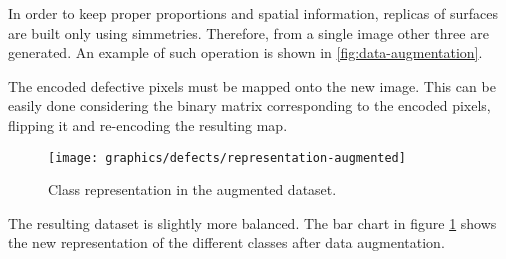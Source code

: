         \par{
            In order to keep proper proportions and spatial information, replicas of surfaces are built only using simmetries. Therefore, from a single image other three are generated. An example of such operation is shown in \ref{fig:data-augmentation}.
        }
        \par{
            The encoded defective pixels must be mapped onto the new image. This can be easily done considering the binary matrix corresponding to the encoded pixels, flipping it and re-encoding the resulting map.
        }
        \begin{figure}
            \texttt{[image: graphics/defects/representation-augmented]}
            \caption{Class representation in the augmented dataset.}\label{fig:defects:representation-augmented}
        \end{figure}
        \par{
            The resulting dataset is slightly more balanced. The bar chart in figure \ref{fig:defects:representation-augmented} shows the new representation of the different classes after data augmentation.
        }